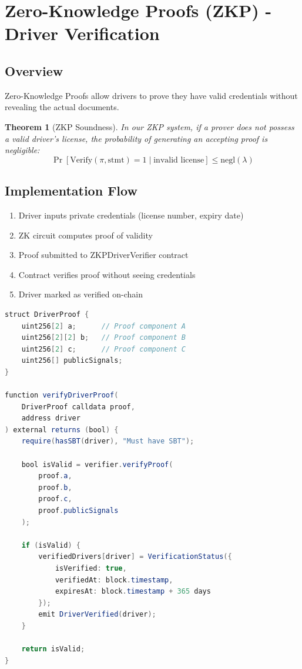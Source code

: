 \documentclass[12pt]{report}
\theoremstyle{plain}
\newtheorem{theorem}{Theorem}[section]
\theoremstyle{definition}
\theoremstyle{remark}
\begin{document}
\section{Zero-Knowledge Proofs (ZKP) - Driver Verification}

\subsection{Overview}

Zero-Knowledge Proofs allow drivers to prove they have valid credentials without revealing the actual documents.

\begin{theorem}[ZKP Soundness]
In our ZKP system, if a prover does not possess a valid driver's license, the probability of generating an accepting proof is negligible:
\begin{equation}
\Pr[\text{Verify}(\pi, \text{stmt}) = 1 \mid \text{invalid license}] \leq \text{negl}(\lambda)
\end{equation}
\end{theorem}

\subsection{Implementation Flow}

\begin{enumerate}
    \item Driver inputs private credentials (license number, expiry date)
    \item ZK circuit computes proof of validity
    \item Proof submitted to ZKPDriverVerifier contract
    \item Contract verifies proof without seeing credentials
    \item Driver marked as verified on-chain
\end{enumerate}

\begin{lstlisting}[language=Java, caption=ZKP Verification Contract]
struct DriverProof {
    uint256[2] a;      // Proof component A
    uint256[2][2] b;   // Proof component B
    uint256[2] c;      // Proof component C
    uint256[] publicSignals;
}

function verifyDriverProof(
    DriverProof calldata proof,
    address driver
) external returns (bool) {
    require(hasSBT(driver), "Must have SBT");
    
    bool isValid = verifier.verifyProof(
        proof.a,
        proof.b,
        proof.c,
        proof.publicSignals
    );
    
    if (isValid) {
        verifiedDrivers[driver] = VerificationStatus({
            isVerified: true,
            verifiedAt: block.timestamp,
            expiresAt: block.timestamp + 365 days
        });
        emit DriverVerified(driver);
    }
    
    return isValid;
}
\end{lstlisting}
\end{document}
